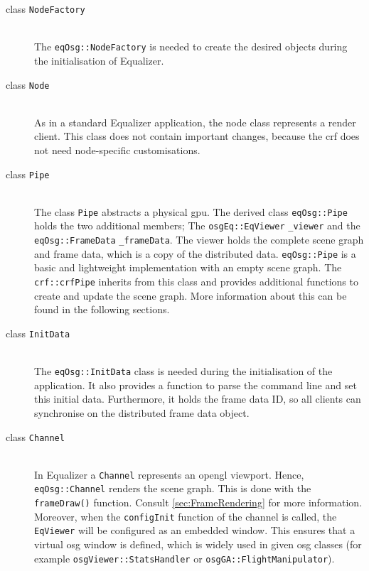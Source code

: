 \begin{description}
	\item[class \texttt{NodeFactory}]\hfill\\
		The \texttt{eqOsg::NodeFactory} is needed to create the desired objects during the initialisation of Equalizer.
	\item [class \texttt{Node}]\hfill\\
		As in a standard Equalizer application, the node class represents a render client. This class does not contain important changes, because the \gls{crf} does not need node-specific customisations.
	\item [class \texttt{Pipe}]\hfill\\
		The class \texttt{Pipe} abstracts a physical \gls{gpu}. The derived class \texttt{eqOsg::Pipe} holds the two additional members; The \texttt{osgEq::EqViewer} \texttt{\_viewer} and the \texttt{eqOsg::FrameData} \texttt{\_frameData}. The viewer holds the complete scene graph and frame data, which is a copy of the distributed data. \texttt{eqOsg::Pipe} is a basic and lightweight implementation with an empty scene graph. The \texttt{crf::crfPipe} inherits from this class and provides additional functions to create and update the scene graph. More information about this can be found in the following sections.%
	\item [class \texttt{InitData}]\hfill\\
		The \texttt{eqOsg::InitData} class is needed during the initialisation of the application. It also provides a function to parse the command line and set this initial data. Furthermore, it holds the frame data ID, so all clients can synchronise on the distributed frame data object.
	\item [class \texttt{Channel}]\hfill\\
 		In Equalizer a \texttt{Channel} represents an \gls{opengl} viewport. Hence, \texttt{eqOsg::Channel} renders the scene graph. This is done with the \texttt{frameDraw()} function. Consult \ref{sec:FrameRendering} for more information. Moreover, when the \texttt{configInit} function of the channel is called, the \texttt{EqViewer} will be configured as an embedded window. This ensures that a virtual \gls{osg} window is defined, which is widely used in given \gls{osg} classes (for example \texttt{osgViewer::StatsHandler} or \texttt{osgGA::FlightManipulator}).
\end{description}

  
